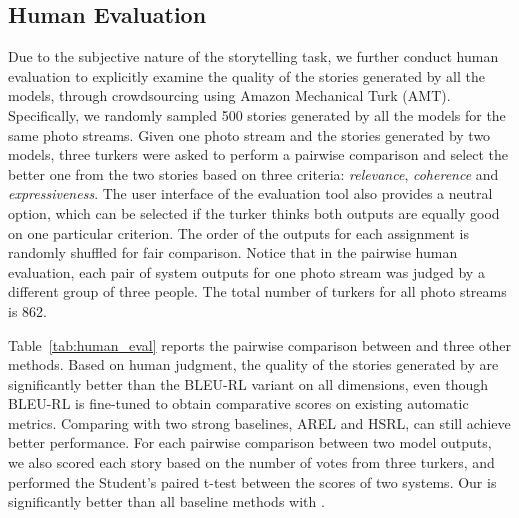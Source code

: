 \documentclass[letterpaper]{article} \usepackage{aaai20}  \usepackage{times}  \usepackage{helvet} \usepackage{courier}  \usepackage[hyphens]{url}  \usepackage{graphicx} \urlstyle{rm} \def\UrlFont{\rm}  \usepackage{graphicx}  \frenchspacing  \setlength{\pdfpagewidth}{8.5in}  \setlength{\pdfpageheight}{11in}  \usepackage{times}
\newcommand{\bleu}{BLEU-RL }
\begin{document}
\subsection{Human Evaluation}
Due to the subjective nature of the storytelling task, we further conduct human evaluation to explicitly examine the quality of the stories generated by all the models, through crowdsourcing using Amazon Mechanical Turk (AMT). 
Specifically, we randomly sampled 500 stories generated by all the models for the same photo streams. Given one photo stream and the stories generated by two models, three turkers were asked to perform a pairwise comparison and select the better one from the two stories based on three criteria: \textit{relevance}, \textit{coherence} and \textit{expressiveness}. 
The user interface of the evaluation tool also provides a neutral option, which can be selected if the turker thinks both outputs are equally good on one particular criterion. The order of the outputs for each assignment is randomly shuffled for fair comparison. Notice that in the pairwise human evaluation, each pair of system outputs for one photo stream was judged by a different group of three people. The total number of turkers for all photo streams is 862.

Table~\ref{tab:human_eval} reports the pairwise comparison between \model and three other methods. 
Based on human judgment, the quality of the stories generated by \model are significantly better than the \bleu variant on all dimensions, even though \bleu is fine-tuned to obtain comparative scores on existing automatic metrics.  Comparing with two strong baselines, AREL and HSRL, \model can still achieve better performance.  For each pairwise comparison between two model outputs, we also scored each story based on the number of votes from three turkers, and performed the Student's paired t-test between the scores of two systems. Our \model is significantly better than all baseline methods with .
\end{document}
